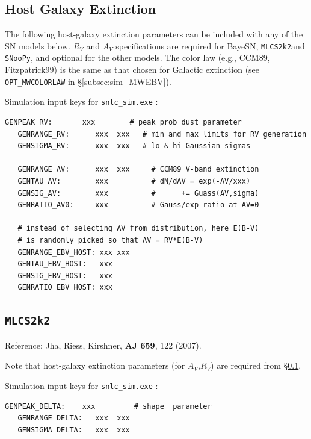 \documentclass[12pt]{article}
\newcommand{\mlcs}{{\tt MLCS2k2}}
\newcommand{\BAYESN}{{\sc BayeSN}}
\newcommand{\snoopy}{{\tt SNooPy}}
\begin{document}
\clearpage
\subsection{Host Galaxy Extinction}
\label{subsec:host_extinct}

The following host-galaxy extinction parameters can be included
with any of the SN models below. $R_V$ and $A_V$ specifications are
required for \BAYESN, \mlcs and \snoopy, and optional for the other models.
The color law (e.g., CCM89, Fitzpatrick99) is the same
as that chosen for Galactic extinction
(see {\tt OPT\_MWCOLORLAW} in \S\ref{subsec:sim_MWEBV}).

\noindent
Simulation input keys  for  {\tt snlc\_sim.exe} :
\begin{Verbatim}[frame=single]
   GENPEAK_RV:       xxx        # peak prob dust parameter
   GENRANGE_RV:      xxx  xxx   # min and max limits for RV generation
   GENSIGMA_RV:      xxx  xxx   # lo & hi Gaussian sigmas

   GENRANGE_AV:      xxx  xxx     # CCM89 V-band extinction
   GENTAU_AV:        xxx          # dN/dAV = exp(-AV/xxx)
   GENSIG_AV:        xxx          #      += Guass(AV,sigma)
   GENRATIO_AV0:     xxx          # Gauss/exp ratio at AV=0

   # instead of selecting AV from distribution, here E(B-V)
   # is randomly picked so that AV = RV*E(B-V)
   GENRANGE_EBV_HOST: xxx xxx
   GENTAU_EBV_HOST:   xxx
   GENSIG_EBV_HOST:   xxx
   GENRATIO_EBV_HOST: xxx
\end{Verbatim}


\clearpage
\subsection{{\mlcs}}
\label{subsec:mlcs}

\noindent
Reference: Jha, Riess, Kirshner, {\bf AJ 659}, 122 (2007). \cite{JRK07}

Note that host-galaxy extinction parameters (for $A_V$,$R_V$) 
are required from \S\ref{subsec:host_extinct}.

\noindent
Simulation input keys  for  {\tt snlc\_sim.exe} :
\begin{Verbatim}[frame=single]
   GENPEAK_DELTA:    xxx         # shape  parameter
   GENRANGE_DELTA:   xxx  xxx
   GENSIGMA_DELTA:   xxx  xxx  
\end{Verbatim}
\end{document}
